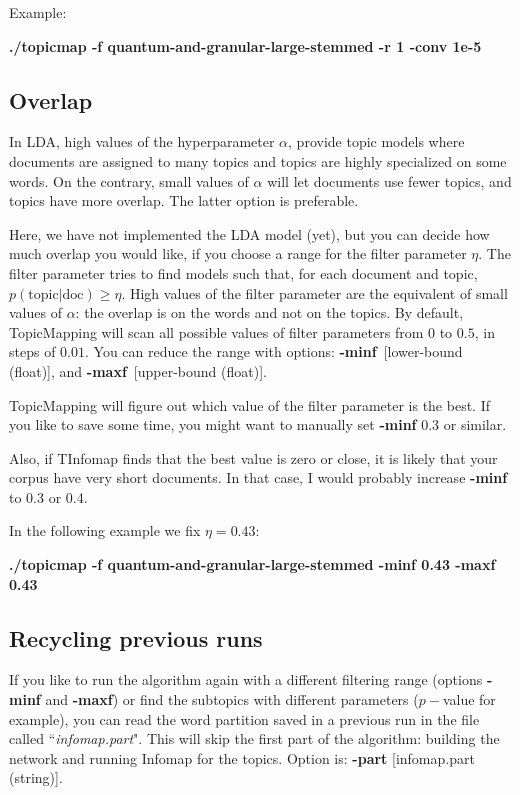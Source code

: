 \documentclass[11pt]{article}
\begin{document}
Example:

\textbf{./topicmap -f quantum-and-granular-large-stemmed -r 1 -conv 1e-5}




\subsection{Overlap}

In LDA, high values of the hyperparameter $\alpha$, provide topic models where documents are assigned to many topics and topics are highly specialized on some words. On the contrary, small values of $\alpha$ will let documents use fewer topics, and topics have more overlap. The latter option is preferable.

Here, we have not implemented the LDA model (yet), but you can decide how much overlap you would like, if you choose a range for the filter parameter $\eta$. The filter parameter tries to find models such that, for each document and topic,  $p(\textrm{topic}|\textrm{doc}) \geqslant \eta$. High values of the filter parameter are the equivalent of small values of $\alpha$: the overlap is on the words and not on the topics. By default, TopicMapping will scan all possible values of filter parameters from $0$ to $0.5$, in steps of $0.01$. 
You can reduce the range with options: \textbf{-minf}~[lower-bound (float)], and \textbf{-maxf}~[upper-bound (float)].

TopicMapping will figure out which value of the filter parameter is the best. If you like to save some time, you might want to manually set \textbf{-minf} $0.3$ or similar.

\small{Also, if  TInfomap finds that the best value is zero or close, it is likely that your corpus have very short documents. In that case, I would probably increase \textbf{-minf} to 0.3 or 0.4}. \normalsize{}

In the following example we fix $\eta=0.43$:

\textbf{./topicmap -f quantum-and-granular-large-stemmed -minf 0.43 -maxf 0.43}


\subsection{Recycling previous runs}

If you like to run the algorithm again with a different filtering range (options \textbf{-minf} and  \textbf{-maxf}) or find the subtopics with different parameters ($p-$value for example), you can read the word partition saved in a previous run in the file called ``\textit{infomap.part}". This will skip the first part of the algorithm: building the network and running Infomap for the topics. Option is: \textbf{-part} [infomap.part (string)].
\end{document}
